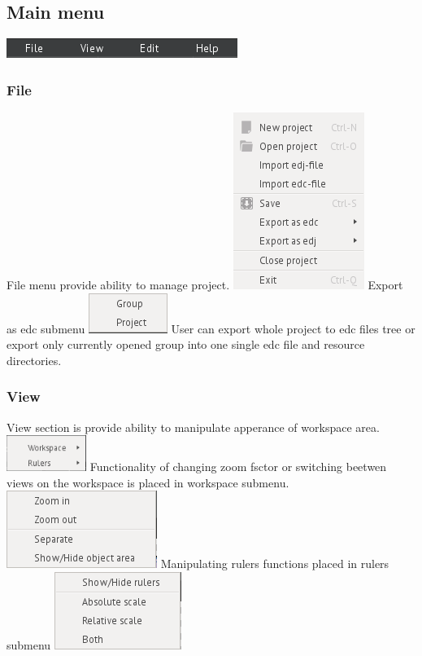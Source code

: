 \documentclass[titlepage,oneside,11pt]{book}
\begin{document}
\subsection{Main menu}
\includegraphics{images/main_menu.png}
\subsubsection{File}
File menu provide ability to manage project. 
\includegraphics{images/file_menu.png}
Export as edc submenu
\includegraphics{images/file_export_as_edc_submenu.png}
User can export whole project to edc files tree or export only currently opened group into one single edc file and resource directories.
\subsubsection{View}
View section is provide ability to manipulate apperance of workspace area.
\includegraphics{images/view_menu.png}
Functionality of changing zoom fsctor or switching beetwen views on the workspace is placed in workspace submenu.
\includegraphics{images/view_workspace_submenu.png}
Manipulating rulers functions placed in rulers submenu
\includegraphics{images/view_rulers_submenu.png}
\end{document}
